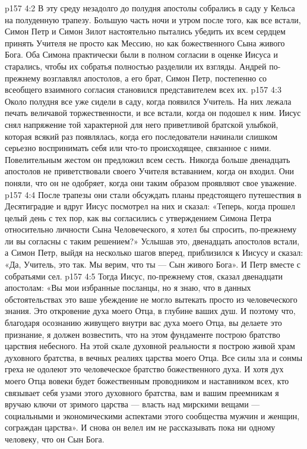 \vs p157 4:2 В эту среду незадолго до полудня апостолы собрались в саду у Кельса на полуденную трапезу. Большую часть ночи и утром после того, как все встали, Симон Петр и Симон Зилот настоятельно пытались убедить их всем сердцем принять Учителя не просто как Мессию, но как божественного Сына живого Бога. Оба Симона практически были в полном согласии в оценке Иисуса и старались, чтобы их собратья полностью разделили их взгляды. Андрей по\hyp{}прежнему возглавлял апостолов, а его брат, Симон Петр, постепенно со всеобщего взаимного согласия становился представителем всех их.
\vs p157 4:3 Около полудня все уже сидели в саду, когда появился Учитель. На них лежала печать величавой торжественности, и все встали, когда он подошел к ним. Иисус снял напряжение той характерной для него приветливой братской улыбкой, которая всякий раз появлялась, когда его последователи начинали слишком серьезно воспринимать себя или что\hyp{}то происходящее, связанное с ними. Повелительным жестом он предложил всем сесть. Никогда больше двенадцать апостолов не приветствовали своего Учителя вставанием, когда он входил. Они поняли, что он не одобряет, когда они таким образом проявляют свое уважение.
\vs p157 4:4 После трапезы они стали обсуждать планы предстоящего путешествия в Десятиградие и вдруг Иисус посмотрел на них и сказал: «Теперь, когда прошел целый день с тех пор, как вы согласились с утверждением Симона Петра относительно личности Сына Человеческого, я хотел бы спросить, по\hyp{}прежнему ли вы согласны с таким решением?» Услышав это, двенадцать апостолов встали, а Симон Петр, выйдя на несколько шагов вперед, приблизился к Иисусу и сказал: «Да, Учитель, это так. Мы верим, что ты --- Сын живого Бога». И Петр вместе с собратьями сел.
\vs p157 4:5 Тогда Иисус, по\hyp{}прежнему стоя, сказал двенадцати апостолам: «Вы мои избранные посланцы, но я знаю, что в данных обстоятельствах это ваше убеждение не могло вытекать просто из человеческого знания. Это откровение духа моего Отца, в глубине ваших душ. И поэтому что, благодаря осознанию живущего внутри вас духа моего Отца, вы делаете это признание, я должен возвестить, что на этом фундаменте построю братство царствия небесного. На этой скале духовной реальности я построю живой храм духовного братства, в вечных реалиях царства моего Отца. Все силы зла и сонмы греха не одолеют это человеческое братство божественного духа. И хотя дух моего Отца вовеки будет божественным проводником и наставником всех, кто связывает себя узами этого духовного братства, вам и вашим преемникам я вручаю ключи от зримого царства --- власть над мирскими вещами --- социальными и экономическими аспектами этого сообщества мужчин и женщин, сограждан царства». И снова он велел им не рассказывать пока ни одному человеку, что он Сын Бога.
